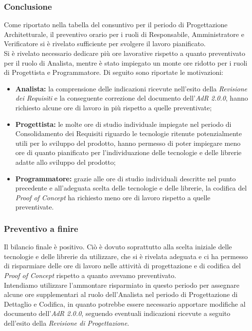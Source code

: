 \subsubsection{Conclusione}
Come riportato nella tabella del consuntivo per il periodo di Progettazione Architetturale, il preventivo orario per i ruoli di Responsabile, Amministratore e Verificatore si è rivelato sufficiente per svolgere il lavoro pianificato. \\
Si è rivelato necessario dedicare più ore lavorative rispetto a quanto preventivato per il ruolo di Analista, mentre è stato impiegato un monte ore ridotto per i ruoli di Progettista e Programmatore. Di seguito sono riportate le motivazioni:
\begin{itemize}
	\item \textbf{Analista:} la comprensione delle indicazioni ricevute nell'esito della \textit{Revisione dei Requisiti} e la conseguente correzione del documento dell'\textit{AdR{} 2.0.0}, hanno richiesto alcune ore di lavoro in più rispetto a quelle preventivate;
	\item \textbf{Progettista:} le molte ore di studio individuale impiegate nel periodo di Consolidamento dei Requisiti riguardo le tecnologie ritenute potenzialmente utili per lo sviluppo del prodotto, hanno permesso di poter impiegare meno ore di quanto pianificato per l'individuazione delle tecnologie e delle librerie adatte allo sviluppo del prodotto;
	\item \textbf{Programmatore:} grazie alle ore di studio individuali descritte nel punto precedente e all'adeguata scelta delle tecnologie e delle librerie, la codifica del \textit{Proof of Concept} ha richiesto meno ore di lavoro rispetto a quelle preventivate.
\end{itemize}
\subsubsection{Preventivo a finire}
Il bilancio finale è positivo. Ciò è dovuto soprattutto alla scelta iniziale delle tecnologie e delle librerie da utilizzare, che si è rivelata adeguata e ci ha permesso di risparmiare delle ore di lavoro nelle attività di progettazione e di codifica del \textit{Proof of Concept} rispetto a quanto avevamo preventivato. \\
Intendiamo utilizzare l'ammontare risparmiato in questo periodo per assegnare alcune ore supplementari al ruolo dell'Analista nel periodo di Progettazione di Dettaglio e Codifica, in quanto potrebbe essere necessario apportare modifiche al documento dell'\textit{AdR{} 2.0.0}, seguendo eventuali indicazioni ricevute a seguito dell'esito della \textit{Revisione di Progettazione}.



